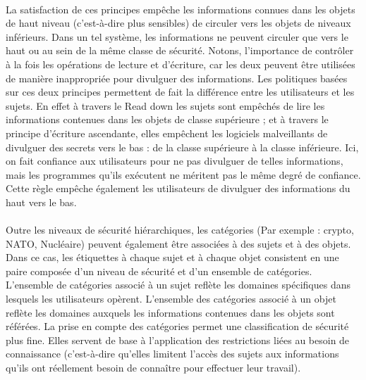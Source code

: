 \paragraph{} La satisfaction de ces principes empêche les informations connues dans les objets de haut niveau (c'est-à-dire plus sensibles) de circuler vers les objets de niveaux inférieurs. Dans un tel système, les informations ne peuvent circuler que vers le haut ou au sein de la même classe de sécurité. Notons, l'importance de contrôler à la fois les opérations de lecture et d'écriture, car les deux peuvent être utilisées de manière inappropriée pour divulguer des informations. Les politiques basées sur ces deux principes permettent de fait la différence entre les utilisateurs et les sujets. En effet à travers le Read down les sujets sont empêchés de lire les informations contenues dans les objets de classe supérieure ; et à travers le principe d'écriture ascendante, elles empêchent les logiciels malveillants de divulguer des secrets vers le bas : de la classe supérieure à la classe inférieure. Ici, on fait confiance aux utilisateurs pour ne pas divulguer de telles informations, mais les programmes qu'ils exécutent ne méritent pas le même degré de confiance. Cette règle empêche également les utilisateurs de divulguer des informations du haut vers le bas.
\paragraph{} Outre les niveaux de sécurité hiérarchiques, les catégories (Par exemple : crypto, NATO, Nucléaire) peuvent également être associées à des sujets et à des objets. Dans ce cas, les étiquettes à chaque sujet et à chaque objet consistent en une paire composée d'un niveau de sécurité et d'un ensemble de catégories. L'ensemble de catégories associé à un sujet reflète les domaines spécifiques dans lesquels les utilisateurs opèrent. L'ensemble des catégories associé à un objet reflète les domaines auxquels les informations contenues dans les objets sont référées. La prise en compte des catégories permet une classification de sécurité plus fine. Elles servent de base à l'application des restrictions liées au besoin de connaissance (c'est-à-dire qu'elles limitent l'accès des sujets aux informations qu'ils ont réellement besoin de connaître pour effectuer leur travail).
